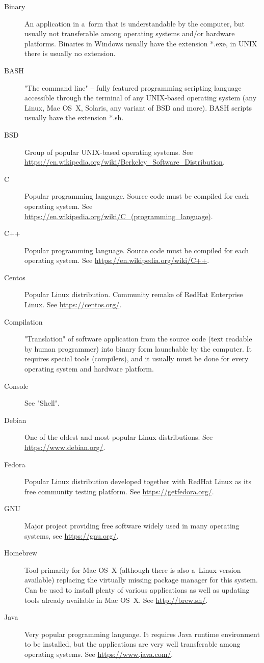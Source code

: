 \documentclass[a4paper, 11pt, twoside]{article}
\begin{document}
\begin{description}
  \item[Binary] An application in a~form that is understandable by the computer, but usually not transferable among operating systems and/or hardware platforms. Binaries in Windows usually have the extension *.exe, in UNIX there is usually no extension.
  \item[BASH] "The command line" -- fully featured programming scripting language accessible through the terminal of any UNIX-based operating system (any Linux, Mac OS~X, Solaris, any variant of BSD and more). BASH scripts usually have the extension *.sh.
  \item[BSD] Group of popular UNIX-based operating systems. See \url{https://en.wikipedia.org/wiki/Berkeley_Software_Distribution}.
  \item[C] Popular programming language. Source code must be compiled for each operating system. See \url{https://en.wikipedia.org/wiki/C_(programming_language)}.
  \item[C++] Popular programming language. Source code must be compiled for each operating system. See \url{https://en.wikipedia.org/wiki/C++}.
  \item[Centos] Popular Linux distribution. Community remake of RedHat Enterprise Linux. See \url{https://centos.org/}.
  \item[Compilation] "Translation" of software application from the source code (text readable by human programmer) into binary form launchable by the computer. It requires special tools (compilers), and it usually must be done for every operating system and hardware platform.
  \item[Console] See "Shell".
  \item[Debian] One of the oldest and most popular Linux distributions. See \url{https://www.debian.org/}.
  \item[Fedora] Popular Linux distribution developed together with RedHat Linux as its free community testing platform. See \url{https://getfedora.org/}.
  \item[GNU] Major project providing free software widely used in many operating systems, see \url{https://gnu.org/}.
  \item[Homebrew] Tool primarily for Mac OS~X (although there is also a~Linux version available) replacing the virtually missing package manager for this system. Can be used to install plenty of various applications as well as updating tools already available in Mac OS~X. See \url{http://brew.sh/}.
  \item[Java] Very popular programming language. It requires Java runtime environment to be installed, but the applications are very well transferable among operating systems. See \url{https://www.java.com/}.

\end{description}
\end{document}
